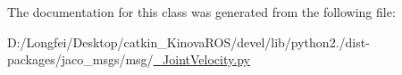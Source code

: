 The documentation for this class was generated from the following file\+:\begin{DoxyCompactItemize}
\item 
D\+:/\+Longfei/\+Desktop/catkin\+\_\+\+Kinova\+R\+O\+S/devel/lib/python2./dist-\/packages/jaco\+\_\+msgs/msg/\hyperlink{__JointVelocity_8py}{\+\_\+\+Joint\+Velocity.\+py}\end{DoxyCompactItemize}
